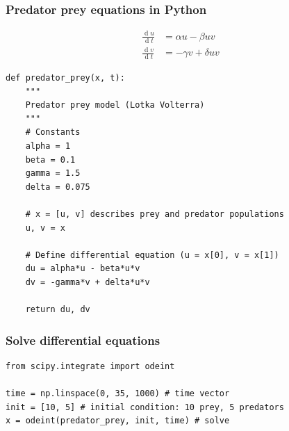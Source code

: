 \documentclass[pdf]{beamer}
\renewcommand{\d}[1]{\ensuremath{\operatorname{d}\!{#1}}} %
\begin{document}
\begin{frame}[fragile]
\frametitle{Predator prey equations in Python}

\vspace{-0.4cm}
\scriptsize
\begin{align*}
 \frac{\d{u}}{\d{t}} &= \alpha u - \beta uv\\[0.5em]
\frac{\d{v}}{\d{t}} &= -\gamma v + \delta uv 
\end{align*}
\normalsize


\begin{lstlisting}[style=python]
def predator_prey(x, t):
    """
	Predator prey model (Lotka Volterra)
    """
    # Constants
    alpha = 1
    beta = 0.1
    gamma = 1.5
    delta = 0.075
    
    # x = [u, v] describes prey and predator populations
    u, v = x
    
    # Define differential equation (u = x[0], v = x[1])
    du = alpha*u - beta*u*v
    dv = -gamma*v + delta*u*v
    
    return du, dv
\end{lstlisting}

\end{frame}

\begin{frame}[fragile]
\frametitle{Solve differential equations}

\begin{lstlisting}[style=python] 
from scipy.integrate import odeint

time = np.linspace(0, 35, 1000) # time vector
init = [10, 5] # initial condition: 10 prey, 5 predators
x = odeint(predator_prey, init, time) # solve
\end{lstlisting}

\vspace{-.8cm}


\end{frame}
\end{document}
